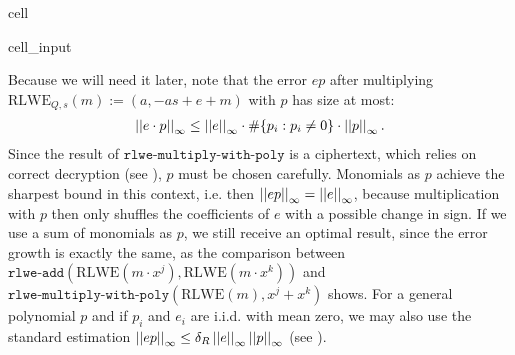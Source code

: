 \documentclass[letterpaper,10pt,english]{jupyterBook}
\begin{document}
\begin{sphinxuseclass}{cell}\begin{sphinxVerbatimInput}

\begin{sphinxuseclass}{cell_input}
\begin{sphinxVerbatim}[commandchars=\\\{\}]
   
     \PYG{p}{[}\PYG{p}{[}\PYG{p}{]}  \PYG{p}{[}\PYG{p}{]} \PYG{p}{]}
\end{sphinxVerbatim}

\end{sphinxuseclass}\end{sphinxVerbatimInput}

\end{sphinxuseclass}
\sphinxAtStartPar
Because we will need it later, note that the error \(ep\) after multiplying \(\mathrm{RLWE}_{Q,s}(m) := (a, -as+e+m)\) with \(p\) has size at most:
\begin{equation}\label{equation:Thesis:rlwe-multiply-error-growth}
\begin{split}\left\lvert\left\lvert  e\cdot p \right\rvert\right\rvert_\infty\le \left\lvert\left\lvert e \right\rvert\right\rvert_\infty \cdot \#\{p_i : p_i \neq 0\} \cdot \left\lvert\left\lvert p \right\rvert\right\rvert_\infty.\end{split}
\end{equation}
\sphinxAtStartPar
Since the result of \(\texttt{rlwe-multiply-with-poly}\) is a ciphertext, which relies on correct decryption (see {\hyperref[\detokenize{Thesis:correct-BFV-decryption}]{}}), \(p\) must be chosen carefully.
Monomials as \(p\) achieve the sharpest bound in this context, i.e. then \(\left\lvert\left\lvert ep \right\rvert\right\rvert_\infty = \left\lvert\left\lvert e \right\rvert\right\rvert_\infty\), because multiplication with \(p\) then only shuffles the coefficients of \(e\) with a possible change in sign.
If we use a sum of monomials as \(p\), we still receive an optimal result, since the error growth is exactly the same, as the comparison between \(\texttt{rlwe-add}(\mathrm{RLWE}(m\cdot x^j),\mathrm{RLWE}(m\cdot x^k))\) and \(\texttt{rlwe-multiply-with-poly}(\mathrm{RLWE}(m),x^j+x^k)\) shows.
For a general polynomial \(p\) and if \(p_i\) and \(e_i\) are i.i.d. with mean zero, we may also use the standard estimation \(\left\lvert\left\lvert ep \right\rvert\right\rvert_\infty
 \le \delta_R \left\lvert\left\lvert e \right\rvert\right\rvert_\infty \left\lvert\left\lvert p \right\rvert\right\rvert_\infty\) (see {\hyperref[\detokenize{Thesis:conclusion-on-delta-r}]{}}).
\end{document}
